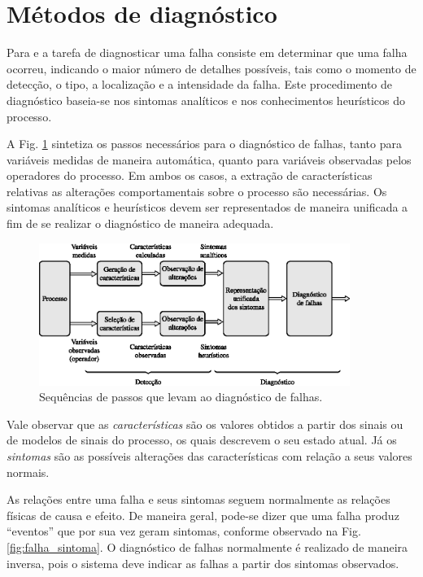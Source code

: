 \section{Métodos de diagnóstico}
Para  e  a tarefa de
diagnosticar uma falha consiste em determinar que uma falha ocorreu, indicando o
maior número de detalhes possíveis, tais como o momento de detecção, o tipo, a
localização e a intensidade da falha. Este procedimento de diagnóstico baseia-se
nos sintomas analíticos e nos conhecimentos heurísticos do processo.

A Fig. \ref{fig:diagnostico} sintetiza os passos necessários para o diagnóstico
de falhas, tanto para variáveis medidas de maneira automática, quanto para
variáveis observadas pelos operadores do processo. Em ambos os casos, a extração
de características relativas as alterações comportamentais sobre o processo são
necessárias. Os sintomas analíticos e heurísticos devem ser representados de
maneira unificada a fim de se realizar o diagnóstico de maneira adequada.

\begin{figure}[htb]
\centering
    \includegraphics[width=0.9\textwidth]{imgs/detec_diag/eps/diagnostico}
    \caption{Sequências de passos que levam ao diagnóstico de falhas.}
    \label{fig:diagnostico}
\end{figure}

Vale observar que as {\it características} são os valores obtidos a partir dos
sinais ou de modelos de sinais do processo, os quais descrevem o seu estado
atual. Já os {\it sintomas} são as possíveis alterações das características com
relação a seus valores normais.

As relações entre uma falha e seus sintomas seguem normalmente as relações
físicas de causa e efeito. De maneira geral, pode-se dizer que uma falha produz
``eventos'' que por sua vez geram sintomas, conforme observado na Fig.
\ref{fig:falha_sintoma}. O diagnóstico de falhas normalmente é realizado de
maneira inversa, pois o sistema deve indicar as falhas a partir dos sintomas
observados.

